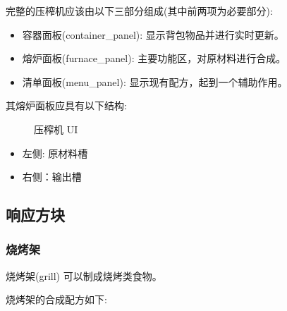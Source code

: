 完整的压榨机应该由以下三部分组成(其中前两项为必要部分):
\begin{itemize}
    \item 容器面板(container\_panel): 显示背包物品并进行实时更新。
    \item 熔炉面板(furnace\_panel): 主要功能区，对原材料进行合成。
    \item 清单面板(menu\_panel): 显示现有配方，起到一个辅助作用。
\end{itemize}

其熔炉面板应具有以下结构:

\begin{figure}[H]
    \centering
    \caption{压榨机 UI}
\end{figure}

\begin{itemize}
    \item 左侧: 原材料槽
    \item 右侧：输出槽
\end{itemize}

\subsection{响应方块}

\subsubsection{烧烤架}

烧烤架(grill) 可以制成烧烤类食物。

烧烤架的合成配方如下:

